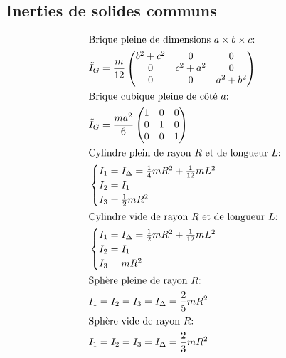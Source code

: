 \documentclass{article}
\numberwithin{equation}{section}
\begin{document}
\subsection{Inerties de solides communs}
\allowdisplaybreaks[1]
\begin{align}
\intertext{Brique pleine de dimensions \(a \times b \times c\):}
&\tilde{I}_G = \dfrac{m}{12}
\begin{pmatrix}
b^2 + c^2 & 0 & 0 \\
0 & c^2 + a^2 & 0 \\
0 & 0 & a^2 + b^2
\end{pmatrix} \\
\intertext{Brique cubique pleine de côté $a$:}
&\tilde{I}_G = \dfrac{ma^2}{6}
\begin{pmatrix}
1 & 0 & 0 \\
0 & 1 & 0 \\
0 & 0 & 1
\end{pmatrix} \\
\intertext{Cylindre plein de rayon $R$ et de longueur $L$:}
&\begin{cases}
I_1 = I_\Delta = \frac{1}{4}mR^2 + \frac{1}{12}mL^2 \\
I_2 = I_1 \\
I_3 = \frac{1}{2}mR^2
\end{cases} \\
\intertext{Cylindre vide de rayon $R$ et de longueur $L$:}
&\begin{cases}
I_1 = I_\Delta = \frac{1}{2}mR^2 + \frac{1}{12}mL^2 \\
I_2 = I_1 \\
I_3 = mR^2
\end{cases} \\
\intertext{Sphère pleine de rayon $R$:}
&I_1 = I_2 = I_3 = I_\Delta = \frac{2}{5}mR^2 \\
\intertext{Sphère vide de rayon $R$:}
&I_1 = I_2 = I_3 = I_\Delta = \frac{2}{3}mR^2
\end{align}
\allowdisplaybreaks[0]
\end{document}
